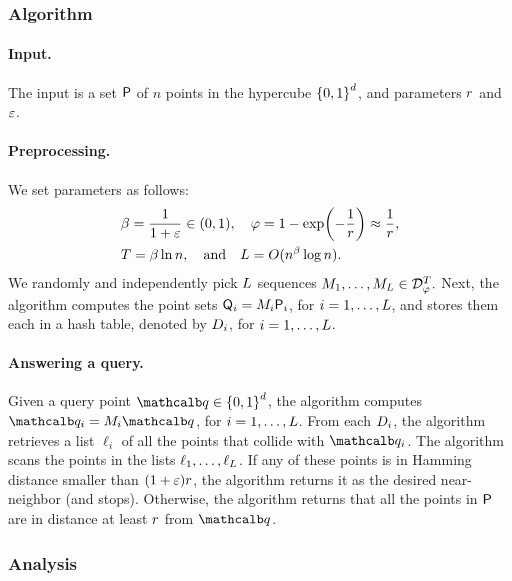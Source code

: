 \subsubsection{Algorithm}

\paragraph{Input.}
The input is a set ${\mathsf{P}}$ of $n$ points in the hypercube
$\left\{ {0,1} \right\}^d$, and parameters $r$ and ${\varepsilon}$.

\paragraph{Preprocessing.}
We set parameters as follows:
\begin{align*}
  & \cTimes = \frac{1}{1+\eps} \in (0,1),%
  \quad  %
  \pr = 1 - \exp \pth{ - \frac{1}{\rad}} \approx \frac{1}{\rad},
  \\
  & \tTimes = \cTimes \ln n,
  \quad
  \text{and}%
  \quad
  \DSTimes = O( n^{\cTimes} \log n).
\end{align*}
We randomly and independently pick $L$ sequences
\begin{math}
    {M}_1, \ldots, {M}_L \in \mathcal{D}_{\varphi}^T.
\end{math}
Next, the algorithm computes the point sets
${\mathsf{Q}}_i = {M}_i {\mathsf{P}}_i$, for $i=1,\ldots, L$, and
stores them each in a hash table, denoted by $D_i$, for
$i=1,\ldots, L$.

\paragraph{Answering a query.}

Given a query point $\query \in \brc{0,1}^d$, the algorithm computes
$\query_i = \seq_i \query$, for $i=1,\ldots, L$.  From each
$D_i$, the algorithm retrieves a list $\ell_i$ of all the points
that collide with $\query_i$. The algorithm scans the points in the
lists $\ell_1, \ldots, \ell_L$. If any of these points is in
Hamming distance smaller than $(1+{\varepsilon})r$, the algorithm returns it
as the desired near-neighbor (and stops). Otherwise, the algorithm
returns that all the points in ${\mathsf{P}}$ are in distance at least
$r$ from $\query$.

\subsubsection{Analysis}


